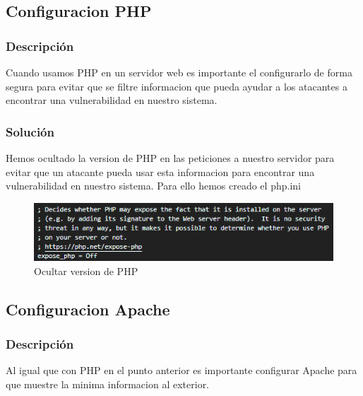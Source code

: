 \documentclass{report}
\begin{document}
            \subsection{Configuracion PHP}
                \subsubsection{Descripción}
                    Cuando usamos PHP en un servidor web es importante el configurarlo de forma segura para evitar que se filtre informacion que pueda ayudar a los atacantes a encontrar una vulnerabilidad en nuestro sistema.
                \subsubsection{Solución}
                    Hemos ocultado la version de PHP en las peticiones a nuestro servidor para evitar que un atacante pueda usar esta informacion para encontrar una vulnerabilidad en nuestro sistema. Para ello hemos creado el php.ini
                    \begin{figure}[H]
                        \centering
                        \includegraphics[width=\textwidth]{./img/vulnerabilidades/3.5/14.1.png}
                        \caption{Ocultar version de PHP}
                    \end{figure}
            \clearpage
            \subsection{Configuracion Apache}
                \subsubsection{Descripción}
                    Al igual que con PHP en el punto anterior es importante configurar Apache para que muestre la minima informacion al exterior.
\end{document}
